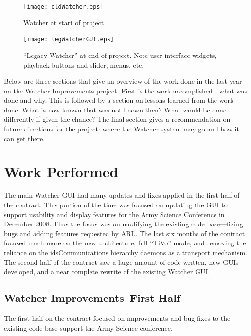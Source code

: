 \documentclass{report}
\begin{document}
\begin{figure}[htb]
\centering
\texttt{[image: oldWatcher.eps]}
\caption{Watcher at start of project}
\label{fig:oldWatcher}
\end{figure}

\begin{figure}[htb]
\centering
\texttt{[image: legWatcherGUI.eps]}
\caption{``Legacy Watcher'' at end of project. Note user interface widgets, playback buttons and slider, menus, etc.}
\label{fig:legWatcherGUI}
\end{figure}

Below are three sections that give an overview of the work done in the last year on the Watcher Improvements project. First
is the work accomplished---what was done and why. This is followed by a section on lessons learned from the work done. What is now known 
that was not known then? What would be done differently if given the chance? The final section gives a recommendation on future directions
for the project: where the Watcher system may go and how it can get there. 

\section{Work Performed}

The main Watcher GUI had many updates and fixes applied in the first half of the contract. This portion of the time was focused on updating the GUI to 
support usability and display features for the Army Science Conference in December 2008. Thus the focus was on modifying the existing code base---fixing bugs 
and adding features requested by ARL. The last six months of the contract focused much more on the new architecture, full ``TiVo'' mode, and removing 
the reliance on the idsCommunications hierarchy daemons as a transport mechanism. The second half of the contract saw a large amount of code written, new GUIs developed, and 
a near complete rewrite of the existing Watcher GUI. 

\subsection{Watcher Improvements--First Half}
The first half on the contract focused on improvements and bug fixes to the existing code base support the Army Science conference.  
\end{document}
